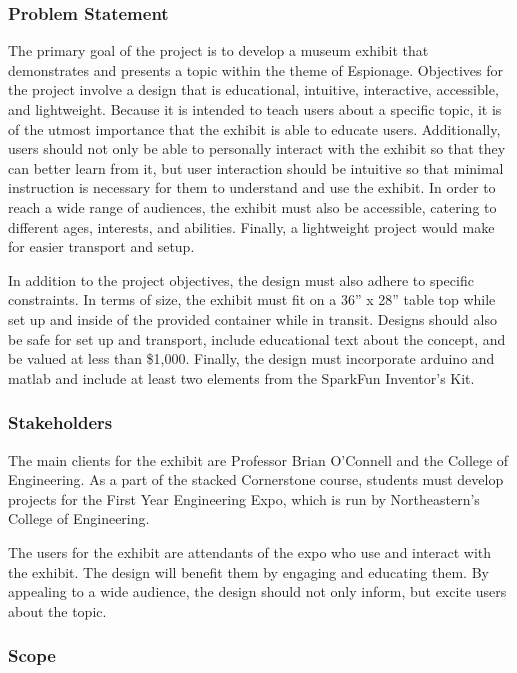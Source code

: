 \documentclass[conference]{IEEEtran}
\begin{document}
\subsubsection{Problem Statement}

\par The primary goal of the project is to develop a museum exhibit that demonstrates and presents a topic within the theme of Espionage.  Objectives for the project involve a design that is educational, intuitive, interactive, accessible, and lightweight.  Because it is intended to teach users about a specific topic, it is of the utmost importance that the exhibit is able to educate users.  Additionally, users should not only be able to personally interact with the exhibit so that they can better learn from it, but user interaction should be intuitive so that minimal instruction is necessary for them to understand and use the exhibit.  In order to reach a wide range of audiences, the exhibit must also be accessible, catering to different ages, interests, and abilities.  Finally, a lightweight project would make for easier transport and setup.
\par In addition to the project objectives, the design must also adhere to specific constraints.  In terms of size, the exhibit must fit on a 36'' x 28'' table top while set up and inside of the provided container while in transit.  Designs should also be safe for set up and transport, include educational text about the concept, and be valued at less than \$1,000.  Finally, the design must incorporate arduino and matlab and include at least two elements from the SparkFun Inventor’s Kit.

\subsubsection{Stakeholders}

\par The main clients for the exhibit are Professor Brian O’Connell and the College of Engineering.  As a part of the stacked Cornerstone course, students must develop projects for the First Year Engineering Expo, which is run by Northeastern’s College of Engineering.  
\par The users for the exhibit are attendants of the expo who use and interact with the exhibit.  The design will benefit them by engaging and educating them.  By appealing to a wide audience, the design should not only inform, but excite users about the topic.  

\subsubsection{Scope}
\end{document}
